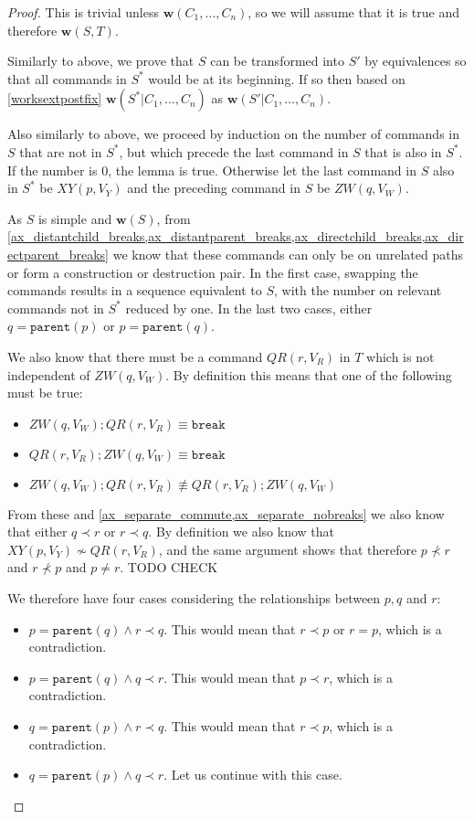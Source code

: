 \documentclass[12pt]{article}
\newcommand{\parent}{\mathtt{parent}}
\newcommand{\cbrk}{\mathtt{break}}
\newcommand{\fscommand}[2]{{#1#2}}
\newcommand{\cxy}{\fscommand{X}{Y}}
\newcommand{\czw}{\fscommand{Z}{W}}
\newcommand{\cqr}{\fscommand{Q}{R}}
\newcommand{\descendant}{\prec}
\newcommand{\nequiv}{\not\equiv}
\newcommand{\indep}{\not\sim}
\newcommand{\works}[1]{{\mathbf{w}}({#1})}
\newcommand{\worksc}[2]{{\mathbf{w}}({#1}|{#2})}
\theoremstyle{definition}
\begin{document}
\begin{proof}
This is trivial unless $\works{C_1,\ldots,C_n}$, so we will assume that it is true
and therefore $\works{S,T}$.

Similarly to above, we prove that $S$ can be transformed into $S'$ by equivalences
so that all commands in $S^*$ would be at its beginning.
If so then based on \cref{worksextpostfix}
$\worksc{S^*}{C_1,\ldots,C_n}$ as $\worksc{S'}{C_1,\ldots,C_n}$.

Also similarly to above,
we proceed by induction on the number of commands in $S$ that are not in $S^*$, but which precede
the last command in $S$ that is also in $S^*$.
If the number is 0, the lemma is true.
Otherwise let the last command in $S$ also in $S^*$ be $\cxy(p,V_Y)$
and the preceding command in $S$ be $\czw(q,V_W)$.

As $S$ is simple and $\works{S}$, from 
\cref{ax_distantchild_breaks,ax_distantparent_breaks,ax_directchild_breaks,ax_directparent_breaks}
we know that these commands can only be on unrelated paths or form a construction or destruction pair.
In the first case, swapping the commands results in a sequence equivalent to $S$,
with the number on relevant commands not in $S^*$ reduced by one.
In the last two cases,
either $q=\parent(p)$ or $p=\parent(q)$.

We also know that there must be a command $\cqr(r,V_R)$ in $T$ which is not independent of $\czw(q,V_W)$.
By definition this means that one of the following must be true:
\begin{itemize}
\item $\czw(q,V_W);\cqr(r,V_R) \equiv\cbrk$
\item $\cqr(r,V_R);\czw(q,V_W) \equiv\cbrk$
\item $\czw(q,V_W);\cqr(r,V_R) \nequiv \cqr(r,V_R);\czw(q,V_W)$
\end{itemize}
From these and \cref{ax_separate_commute,ax_separate_nobreaks} we also know that
either $q\descendant r$ or $r\descendant q$.
By definition we also know that $\cxy(p,V_Y)\indep \cqr(r,V_R)$,
and the same argument shows that therefore
$p\not\descendant r$ and $r\not\descendant p$ and $p\neq r$. TODO CHECK

We therefore have four cases considering the relationships between $p,q$ and $r$:
\begin{itemize}
\item $p=\parent(q) \wedge r\descendant q$.
   This would mean that $r\descendant p$ or $r=p$, which is a contradiction.
\item $p=\parent(q) \wedge q\descendant r$.
   This would mean that $p\descendant r$, which is a contradiction.
\item $q=\parent(p) \wedge r\descendant q$.
   This would mean that $r\descendant p$, which is a contradiction.  
\item $q=\parent(p) \wedge q\descendant r$.
   Let us continue with this case.
\end{itemize}


\end{proof}
\end{document}

